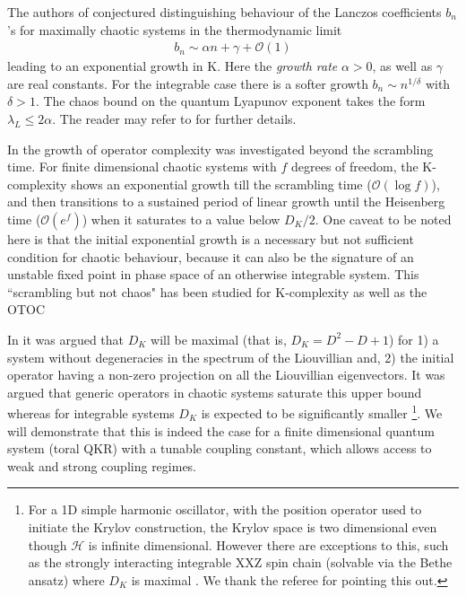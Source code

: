 \documentclass[a4paper,12pt]{article}
\begin{document}
The authors of \cite{Parker_2019} conjectured distinguishing behaviour of the Lanczos coefficients $b_n$'s for maximally chaotic systems in the thermodynamic limit
  \begin{align}
  b_n \sim \alpha n +\gamma+\mathcal{O}(1)
  \end{align}
leading to an exponential growth in K. Here the {\it growth rate} $\alpha >0$, as well as $\gamma$ are real constants. For the integrable case there is a softer growth $b_n \sim n^ {1/\delta}$ with $ \delta >1$. The chaos bound \cite{Maldacena:2015waa} on the quantum Lyapunov exponent takes the form $\lambda_L \le 2 \alpha$.  The reader may refer to \cite{Parker_2019} for further details.

In \cite{Rabinovici:2019wsy} the growth of operator complexity was investigated beyond the scrambling time. For finite dimensional chaotic systems with $f$ degrees of freedom,  the K-complexity shows an exponential growth till the scrambling time ($\mathcal{O}(\log f)$), and then transitions to a sustained period of linear growth until the Heisenberg time ($\mathcal{O}(e^{f})$) when it saturates to a value below $D_K/2$. One caveat to be noted here is that the initial exponential growth is a necessary but not sufficient condition for chaotic behaviour, because it can also be the signature of an unstable fixed point in phase space of an otherwise integrable system. This ``scrambling but not chaos" has been studied for K-complexity \cite{Bhattacharjee:2022vlt}  as well as the OTOC \cite{Xu:2019lhc, Dowling:2023hqc}

In \cite{Rabinovici_2021} it was argued that $D_K$ will be maximal (that is, $D_K=D^ 2-D+1$) for 1) a system without degeneracies in the spectrum of the Liouvillian and, 2)  the initial operator having a non-zero projection on all the Liouvillian eigenvectors. It was argued that generic operators in chaotic systems saturate this upper bound whereas for integrable systems $D_K$ is expected to be significantly smaller \footnote{For a 1D simple harmonic oscillator, with the position operator used to initiate the Krylov construction, the Krylov space is two dimensional even though $\mathcal{H}$ is infinite dimensional. However there are  exceptions to this, such as the strongly interacting integrable XXZ spin chain (solvable via the Bethe ansatz) where $D_K$ is maximal \cite{Rabinovici_2022}. We thank the referee for pointing this out.}. We will demonstrate that this is indeed the case for a finite dimensional quantum system (toral QKR) with a tunable coupling constant, which allows access to weak and strong coupling regimes.
\end{document}
